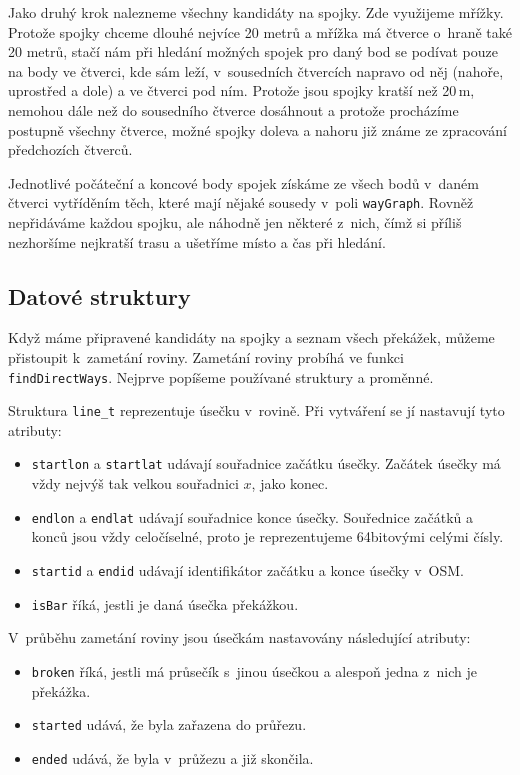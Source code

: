 Jako druhý krok nalezneme všechny kandidáty na spojky. Zde využijeme mřížky.
Protože spojky chceme dlouhé nejvíce 20 metrů a mřížka má čtverce o~hraně také
20 metrů, stačí nám při hledání možných spojek pro daný bod se podívat pouze na
body ve čtverci, kde sám leží, v~sousedních čtvercích napravo od něj (nahoře,
uprostřed a dole) a ve čtverci pod ním. Protože jsou spojky kratší než 20\,m,
nemohou dále než do sousedního čtverce dosáhnout a protože procházíme postupně
všechny čtverce, možné spojky doleva a nahoru již známe ze zpracování
předchozích čtverců. 

Jednotlivé počáteční a koncové body spojek získáme ze všech bodů v~daném čtverci
vytříděním těch, které mají nějaké sousedy v~poli \verb|wayGraph|. Rovněž
nepřidáváme každou spojku, ale náhodně jen některé z~nich, čímž si příliš
nezhoršíme nejkratší trasu a ušetříme místo a čas při hledání.

\subsection{Datové struktury}
Když máme připravené kandidáty na spojky a seznam všech překážek, můžeme
přistoupit k~zametání roviny. Zametání roviny probíhá ve funkci
\verb|findDirectWays|. Nejprve popíšeme používané struktury a proměnné.

Struktura \verb|line_t| reprezentuje úsečku v~rovině. Při vytváření se jí
nastavují tyto atributy:
\begin{itemize}
	\item \verb|startlon| a \verb|startlat| udávají souřadnice začátku
	úsečky. Začátek úsečky má vždy nejvýš tak velkou souřadnici $x$, jako
	konec.
	\item \verb|endlon| a \verb|endlat| udávají souřadnice konce úsečky.
	Souřednice začátků a konců jsou vždy celočíselné, proto je
	reprezentujeme 64bitovými celými čísly.
	\item \verb|startid| a \verb|endid| udávají identifikátor začátku a
	konce úsečky v~OSM.
	\item \verb|isBar| říká, jestli je daná úsečka překážkou.
\end{itemize}
V~průběhu zametání roviny jsou úsečkám nastavovány následující atributy:
\begin{itemize}
	\item \verb|broken| říká, jestli má průsečík s~jinou úsečkou a alespoň
	jedna z~nich je překážka.
	\item \verb|started| udává, že byla zařazena do průřezu.
	\item \verb|ended| udává, že byla v~průžezu a již skončila.
\end{itemize}

